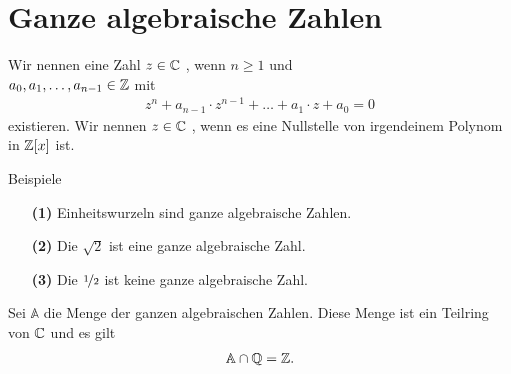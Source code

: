 \section{Ganze algebraische Zahlen}

\begin{df}\label{skript:12.1}
	Wir nennen eine Zahl $z \in \mathbb{C}$ ,
	wenn $n \geq 1$ und\\
	$a_0, a_1, \dots , a_{n-1} \in \mathbb{Z}$ mit
	\begin{align*}
	z^n + a_{n-1} \cdot z^{n-1} + \dots +  a_1 \cdot z + a_0 = 0
	\end{align*}
	existieren.
	Wir nennen $z \in \mathbb{C}$ , wenn es eine Nullstelle von irgendeinem
	Polynom in $\mathbb{Z}[x]$ ist.
\end{df}

\begin{genericdf}{Beispiele}\label{skript:12.2} \
	\begin{enumerate}
		\item[\textbf{(1)}]
		Einheitswurzeln sind ganze algebraische Zahlen.
		
		\item[\textbf{(2)}]
		Die $\sqrt{2}$ ist eine ganze algebraische Zahl.
		
		\item[\textbf{(3)}]
		Die $\nicefrac{1}{2}$ ist keine ganze algebraische Zahl.
	\end{enumerate}

\end{genericdf}

\begin{sz}\label{skript:12.3}
	Sei $\mathbb{A} $ die Menge der ganzen algebraischen Zahlen.
	Diese Menge ist ein Teilring von $\mathbb{C}$ und es gilt
	\begin{align*}
	\mathbb{A} \cap \mathbb{Q} = \mathbb{Z}.
	\end{align*}
\end{sz}